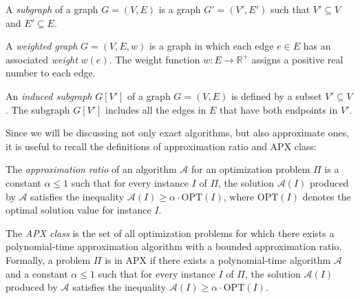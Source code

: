 \begin{definition}[subgraph]
    \label{def:subgraph}
    A \emph{subgraph} of a graph \( G = (V, E) \) is a graph \( G' = (V', E') \) such that \( V' \subseteq V \) and \( E' \subseteq E \).
\end{definition}

\begin{definition}
    \label{def:weightedGraph}
    A \emph{weighted graph} \( G = (V, E, w) \) is a graph in which each edge \( e \in E \) has an associated \emph{weight} \( w(e) \). The weight function \( w: E \rightarrow \mathbb{R}^+ \) assigns a positive real number to each edge.
\end{definition}

\begin{definition}
    \label{def:inducedSubgraph}
    An \emph{induced subgraph} \( G[V'] \) of a graph \( G = (V, E) \) is defined by a subset \( V' \subseteq V \). The subgraph \( G[V'] \) includes all the edges in \( E \) that have both endpoints in \( V' \).
\end{definition}

\noindent
Since we will be discussing not only exact algorithms, but also approximate ones, it is useful to recall the definitions of approximation ratio and APX class:

\begin{definition}
    \label{def:approx_ratio}
    The \emph{approximation ratio} of an algorithm \(\mathcal{A}\) for an optimization problem \(\Pi\) is a constant \(\alpha \leq 1\) such that for every instance \(I\) of \(\Pi\), the solution \(\mathcal{A}(I)\) produced by \(\mathcal{A}\) satisfies the inequality \( \mathcal{A}(I) \geq \alpha \cdot \mathrm{OPT}(I) \), where \(\mathrm{OPT}(I)\) denotes the optimal solution value for instance \(I\).
\end{definition}

\begin{definition}
    \label{def:APX}
    The \emph{APX class} is the set of all optimization problems for which there exists a polynomial-time approximation algorithm with a bounded approximation ratio. Formally, a problem \( \Pi \) is in APX if there exists a polynomial-time algorithm \(\mathcal{A}\) and a constant \(\alpha \leq 1\) such that for every instance \(I\) of \(\Pi\), the solution \(\mathcal{A}(I)\) produced by \(\mathcal{A}\) satisfies the inequality \( \mathcal{A}(I) \geq \alpha \cdot \mathrm{OPT}(I) \).
\end{definition}


